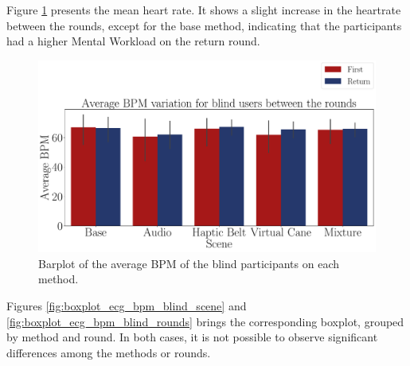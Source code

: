 

Figure \ref{fig:barplot_ecg_bpm_5_scene_blind} presents the mean heart rate. It shows a slight increase in the heartrate between the rounds, except for the base method, indicating that the participants had a higher Mental Workload on the return round.

\begin{figure}[!htb]
    \centering
    \includegraphics[width = \textwidth]{Resultados/ECG/Figuras/pdf/barplot_ecg_bpm_5_scene_blind.pdf}
    \caption{Barplot of the average BPM of the blind participants on each method.}
    \label{fig:barplot_ecg_bpm_5_scene_blind}
\end{figure}

% 
%

Figures \ref{fig:boxplot_ecg_bpm_blind_scene} and \ref{fig:boxplot_ecg_bpm_blind_rounds} brings the corresponding boxplot, grouped by method and round. In both cases, it is not possible to observe significant differences among the methods or rounds.

